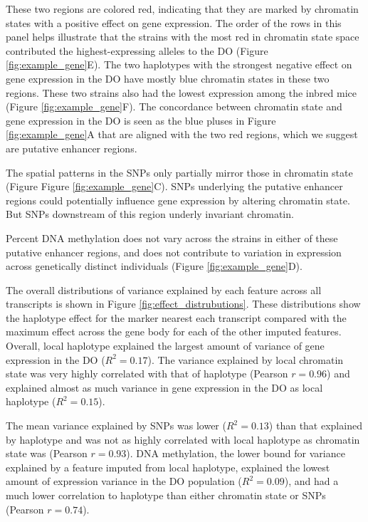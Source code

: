 \documentclass[10pt,letterpaper]{article}
\begin{document}
These two regions are colored red, indicating that they are marked by
chromatin states with a positive effect on gene expression. The order of
the rows in this panel helps illustrate that the strains with the most
red in chromatin state space contributed the highest-expressing alleles
to the DO (Figure \ref{fig:example_gene}E). The two haplotypes with the
strongest negative effect on gene expression in the DO have mostly blue
chromatin states in these two regions. These two strains also had the
lowest expression among the inbred mice (Figure
\ref{fig:example_gene}F). The concordance between chromatin state and
gene expression in the DO is seen as the blue pluses in Figure
\ref{fig:example_gene}A that are aligned with the two red regions, which
we suggest are putative enhancer regions.

The spatial patterns in the SNPs only partially mirror those in
chromatin state (Figure Figure \ref{fig:example_gene}C). SNPs underlying
the putative enhancer regions could potentially influence gene
expression by altering chromatin state. But SNPs downstream of this
region underly invariant chromatin.

Percent DNA methylation does not vary across the strains in either of
these putative enhancer regions, and does not contribute to variation in
expression across genetically distinct individuals (Figure
\ref{fig:example_gene}D).

The overall distributions of variance explained by each feature across
all transcripts is shown in Figure \ref{fig:effect_distrubutions}. These
distributions show the haplotype effect for the marker nearest each
transcript compared with the maximum effect across the gene body for
each of the other imputed features. Overall, local haplotype explained
the largest amount of variance of gene expression in the DO
(\(R^2 = 0.17\)). The variance explained by local chromatin state was
very highly correlated with that of haplotype (Pearson \(r = 0.96\)) and
explained almost as much variance in gene expression in the DO as local
haplotype (\(R^2 = 0.15\)).

The mean variance explained by SNPs was lower (\(R^2 = 0.13\)) than that
explained by haplotype and was not as highly correlated with local
haplotype as chromatin state was (Pearson \(r = 0.93\)). DNA
methylation, the lower bound for variance explained by a feature imputed
from local haplotype, explained the lowest amount of expression variance
in the DO population (\(R^2 = 0.09\)), and had a much lower correlation
to haplotype than either chromatin state or SNPs (Pearson \(r = 0.74\)).
\end{document}
